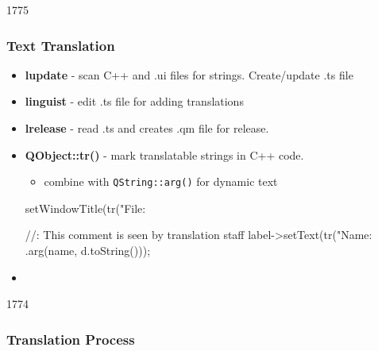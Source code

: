 \begin{slide}[fragile]{1775}\frametitle{Text Translation}
  
  \begin{itemize}
  \item \textbf{lupdate} - scan C++ and .ui files for strings. Create/update .ts file
  \item \textbf{linguist} - edit .ts file for adding translations
  \item \textbf{lrelease} - read .ts and creates .qm file for release.     
  \item \textbf{QObject::tr()} - mark translatable strings in C++ code.
    \begin{itemize}
    \item combine with \texttt{QString::arg()} for dynamic text
    \end{itemize}        
 \begin{cpp}
  setWindowTitle(tr("File: %

  //: This comment is seen by translation staff
  label->setText(tr("Name: %
                .arg(name, d.toString()));
\end{cpp}
\item {}
  \end{itemize}
\end{slide}

\begin{slide}{1774}\frametitle{Translation Process}
\end{slide}

